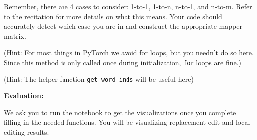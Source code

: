 \documentclass[11pt,addpoints,answers]{exam}
\begin{document}
\begin{questions}
Remember, there are 4 cases to consider: 1-to-1, 1-to-n, n-to-1, and n-to-m. Refer to the recitation for more details on what this means. Your code should accurately detect which case you are in and construct the appropriate mapper matrix.

(Hint: For most things in PyTorch we avoid for loops, but you needn't do so here. Since this method is only called once during initialization, \lstinline{for} loops are fine.)

(Hint: The helper function \lstinline{get_word_inds} will be useful here)

\textbf{Evaluation:} 

We ask you to run the notebook to get the visualizations once you complete filling in the needed functions. You will be visualizing replacement edit and local editing results.

\clearpage


\end{questions}
\end{document}
